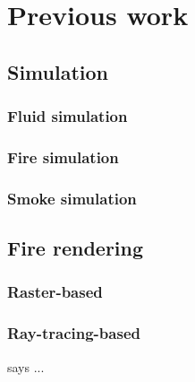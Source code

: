 \chapter{Previous work}

\section{Simulation}

\subsection{Fluid simulation}

\subsection{Fire simulation}

\subsection{Smoke simulation}

\section{Fire rendering}

\subsection{Raster-based}

\subsection{Ray-tracing-based}

\cite{Pegoraro:2006} says ...